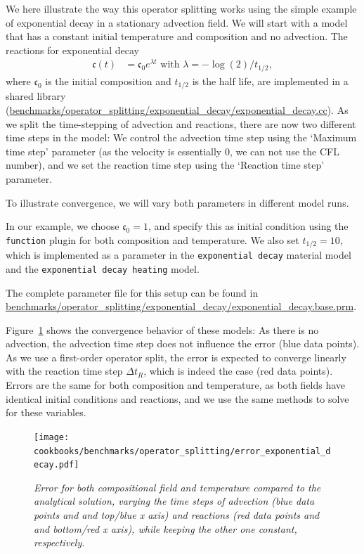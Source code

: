 \documentclass{article}
\begin{document}
We here illustrate the way this operator splitting works using the simple example of exponential decay in a stationary advection field. We will start with a model that has a constant initial temperature and composition and no advection. The reactions for exponential decay 
\begin{align}
  \mathfrak{c}(t) 
  &=
  \mathfrak{c}_0 e^{\lambda t} \text{ with } \lambda = - \log(2)/t_{1/2}, 
\end{align}
where $\mathfrak{c}_0$ is the initial composition and $t_{1/2}$ is the half life, are implemented in a shared library
(\url{benchmarks/operator_splitting/exponential_decay/exponential_decay.cc}). 
As we split the time-stepping of advection and reactions, there are now two different time steps in the model:
We control the advection time step using the `Maximum time step' parameter (as the velocity is essentially 0, 
we can not use the CFL number), and we set the reaction time step using the `Reaction time step' parameter. 

To illustrate convergence, we will vary both parameters in different model runs. 

In our example, we choose $\mathfrak{c}_0=1$, and specify this as initial condition using the \texttt{function} plugin for both composition and temperature. We also set $t_{1/2}=10$, which is implemented as a parameter in the \texttt{exponential decay} material model and the \texttt{exponential decay heating} model. 

The complete parameter file for this setup can be found in \url{benchmarks/operator_splitting/exponential_decay/exponential_decay.base.prm}.

Figure~\ref{fig:exponential-decay} shows the convergence behavior of these models: As there is no advection, the advection time step does not influence the error (blue data points). As we use a first-order operator split, the error is expected to converge linearly with the reaction time step $\Delta t_R$, which is indeed the case (red data points).
Errors are the same for both composition and temperature, as both fields have identical initial conditions and reactions, and we use the same methods to solve for these variables. 
\begin{figure}
  \begin{center}
    \texttt{[image: cookbooks/benchmarks/operator\_splitting/error\_exponential\_decay.pdf]}
  \end{center}
  \caption{\it Error for both compositional field and temperature compared to the analytical solution, varying the time steps of advection (blue data points and and top/blue x axis) and reactions (red data points and and bottom/red x axis), while keeping the other one constant, respectively.}
  \label{fig:exponential-decay}
\end{figure}
\end{document}
